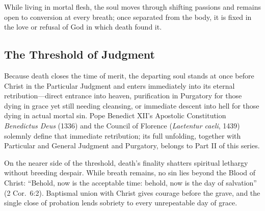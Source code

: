 While living in mortal flesh, the soul moves through shifting passions and remains open to conversion at every breath; once separated from the body, it is fixed in the love or refusal of God in which death found it.

\subsection{The Threshold of Judgment}

Because death closes the time of merit, the departing soul stands at once before Christ in the Particular Judgment and enters immediately into its eternal retribution---direct entrance into heaven, purification in Purgatory for those dying in grace yet still needing cleansing, or immediate descent into hell for those dying in actual mortal sin. Pope Benedict XII's Apostolic Constitution \emph{Benedictus Deus} (1336) and the Council of Florence (\emph{Laetentur caeli}, 1439) solemnly define that immediate retribution; its full unfolding, together with Particular and General Judgment and Purgatory, belongs to Part II of this series.

On the nearer side of the threshold, death's finality shatters spiritual lethargy without breeding despair. While breath remains, no sin lies beyond the Blood of Christ: ``Behold, now is the acceptable time: behold, now is the day of salvation'' (2 Cor.\ 6:2). Baptismal union with Christ gives courage before the grave, and the single close of probation lends sobriety to every unrepeatable day of grace.
